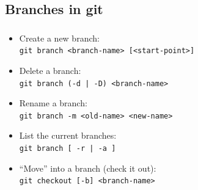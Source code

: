 
\subsection{Branches in git}

\begin{frame}
  \frametitle{\insertsubsection}

  \begin{itemize}
  \item Create a new branch:\\
    \texttt{git branch <branch-name> [<start-point>]}
    \vspacing
  \item Delete a branch:\\
    \texttt{git branch (-d | -D) <branch-name>}
    \vspacing
  \item Rename a branch:\\
    \texttt{git branch -m <old-name> <new-name>}
    \vspacing
  \item List the current branches:\\
    \texttt{git branch [ -r | -a ]}
    \vspacing
  \item ``Move'' into a branch (check it out):\\
    \texttt{git checkout [-b] <branch-name>}
    \vspacing
\end{itemize}
\end{frame}

